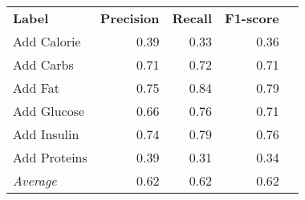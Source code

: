 \begin{tabular}{lrrrr}
    \textbf{Label} & \textbf{Precision} & \textbf{Recall} & \textbf{F1-score} \\
    Add Calorie & 0.39 & 0.33 & 0.36 \\
    Add Carbs & 0.71 & 0.72 & 0.71 \\
    Add Fat & 0.75 & 0.84 & 0.79 \\
    Add Glucose & 0.66 & 0.76 & 0.71 \\
    Add Insulin & 0.74 & 0.79 & 0.76 \\
    Add Proteins & 0.39 & 0.31 & 0.34 \\
    \emph{Average} & 0.62 & 0.62 & 0.62 \\
\end{tabular}